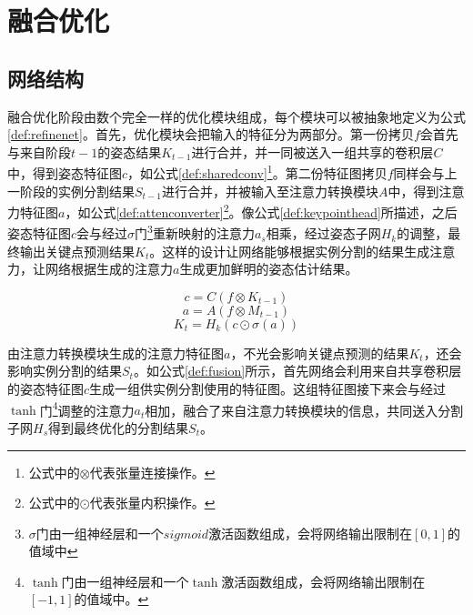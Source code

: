 \section{融合优化}
\label{sec:refine}
\subsection{网络结构}
\label{subsec:architecture}
融合优化阶段由数个完全一样的优化模块组成，每个模块可以被抽象地定义为公式\eqref{def:refinenet}。首先，优化模块会把输入的特征分为两部分。第一份拷贝$f$会首先与来自阶段$t-1$的姿态结果$K_{t-1}$进行合并，并一同被送入一组共享的卷积层$C$中，得到姿态特征图$c$，如公式\eqref{def:sharedconv}\footnote{公式中的$\otimes$代表张量连接操作。}。第二份特征图拷贝$f$同样会与上一阶段的实例分割结果$S_{t-1}$进行合并，并被输入至注意力转换模块$A$中，得到注意力特征图$a$，如公式\eqref{def:attenconverter}\footnote{公式中的$\odot$代表张量内积操作。}。像公式\eqref{def:keypointhead}所描述，之后姿态特征图$c$会与经过$\sigma$门\footnote{$\sigma$门由一组神经层和一个$sigmoid$激活函数组成，会将网络输出限制在$[0,1]$的值域中}重新映射的注意力$a_s$相乘，经过姿态子网$H_k$的调整，最终输出关键点预测结果$K_t$。这样的设计让网络能够根据实例分割的结果生成注意力，让网络根据生成的注意力$a$生成更加鲜明的姿态估计结果。

\begin{equation}
\label{def:sharedconv}
c = C(f\otimes{K_{t-1}})
\end{equation}
\begin{equation}
\label{def:attenconverter}
a = A(f\otimes{M_{t-1}})
\end{equation}
\begin{equation}
\label{def:keypointhead}
K_t = H_k(c\odot \sigma(a))
\end{equation}

由注意力转换模块生成的注意力特征图$a$，不光会影响关键点预测的结果$K_t$，还会影响实例分割的结果$S_t$。如公式\eqref{def:fusion}所示，首先网络会利用来自共享卷积层的姿态特征图$c$生成一组供实例分割使用的特征图。这组特征图接下来会与经过$\tanh$门\footnote{$\tanh$门由一组神经层和一个$\tanh$激活函数组成，会将网络输出限制在$[-1, 1]$的值域中。}调整的注意力$a_t$相加，融合了来自注意力转换模块的信息，共同送入分割子网$H_s$得到最终优化的分割结果$S_t$。

